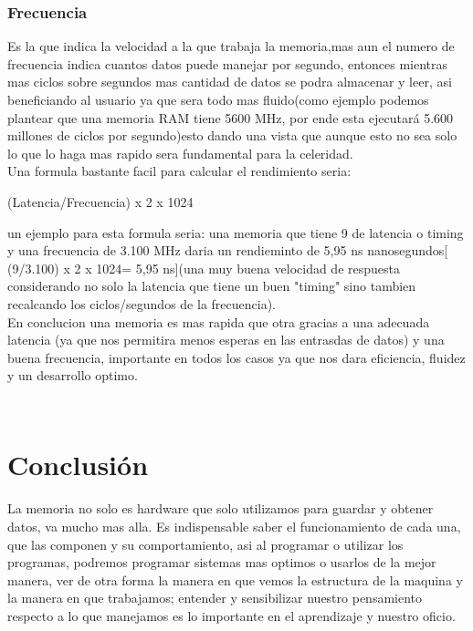 \documentclass{article}
\begin{document}
        \subsubsection{Frecuencia} Es la que indica la velocidad a la que trabaja la memoria,mas aun el numero de frecuencia indica cuantos datos puede manejar por segundo\cite{computerhoy}, entonces mientras mas ciclos sobre segundos mas cantidad de datos se podra almacenar y leer, asi beneficiando al usuario ya que sera todo mas fluido(como ejemplo podemos plantear que una memoria RAM tiene 5600 MHz, por ende esta ejecutará 5.600 millones de ciclos por segundo)esto dando una vista que aunque esto no sea solo lo que lo haga mas rapido sera fundamental para la celeridad.\\
        
        Una formula bastante facil para calcular el rendimiento  seria: 
        
        \vspace{0,5 cm}
        
        (Latencia/Frecuencia) x 2 x 1024
        
        \vspace{0,5 cm}
        
        un ejemplo para esta formula seria: una memoria que tiene 9 de latencia o timing y una frecuencia de 3.100 MHz daria un rendieminto de 5,95 ns nanosegundos[ (9/3.100) x 2 x 1024= 5,95 ns](una muy buena velocidad de respuesta considerando no solo la latencia que tiene un buen "timing" sino tambien recalcando los ciclos/segundos de la frecuencia).\\
        
        En conclucion una memoria es mas rapida que otra gracias a una adecuada latencia (ya que nos permitira menos esperas en las entrasdas de datos) y una buena frecuencia, importante en todos los casos ya que nos dara eficiencia, fluidez y un desarrollo optimo.
    
    \subsection{}
\begin{lstlisting}

\end{lstlisting}

\section{Conclusión} \label{conclulsion}
La memoria no solo es hardware que solo utilizamos para guardar y obtener datos, va mucho mas alla. Es indispensable saber el funcionamiento de cada una, que las componen y su comportamiento, asi al programar o utilizar los programas, podremos programar sistemas mas optimos o usarlos de la mejor manera, ver de otra forma la manera en que vemos la estructura de la maquina y la manera en que trabajamos; entender y sensibilizar nuestro pensamiento respecto a lo que manejamos es lo importante en el aprendizaje y nuestro oficio.



\end{document}
